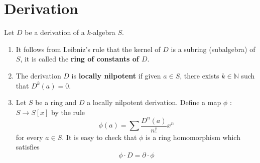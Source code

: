 \documentclass[12pt, oneside]{book}
\begin{document}
\section{Derivation} %

\begin{definition}
    Let $D$ be a derivation of a $k$-algebra $S$.
    \begin{enumerate}
        \item
              It follows from Leibniz's rule that the kernel of $D$ is a subring (subalgebra) of $S$, it is called the \textbf{ring of constants of $D$}.

        \item
              The derivation $D$ is \textbf{locally nilpotent} if given $a \in S$, there exists $k \in \mathbb{N}$ such that $D^k(a)=0$.

        \item
              Let $S$ be a ring and $D$ a locally nilpotent derivation. Define a map $\phi$ : $S \longrightarrow S[x]$ by the rule
              \begin{equation*}
                  \phi(a)=\sum \frac{D^n(a)}{n!} x^n
              \end{equation*}
              for every $a \in S$.
              It is easy to check that $\phi$ is a ring homomorphism which satisfies
              \begin{equation*}
                  \phi \cdot D=\partial \cdot \phi
              \end{equation*}
    \end{enumerate}
\end{definition}
\end{document}
